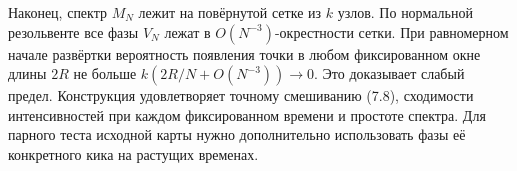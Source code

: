 \documentclass[11pt,a4paper]{article}
\begin{document}
Наконец, спектр $M_N$ лежит на повёрнутой сетке из $k$ узлов. По нормальной резольвенте все фазы $V_N$ лежат в $O(N^{-3})$-окрестности сетки. При равномерном начале развёртки вероятность появления точки в любом фиксированном окне длины $2R$ не больше $k(2R/N+O(N^{-3}))\to0$. Это доказывает слабый предел. Конструкция удовлетворяет точному смешиванию (7.8), сходимости интенсивностей при каждом фиксированном времени и простоте спектра. Для парного теста исходной карты нужно дополнительно использовать фазы её конкретного кика на растущих временах.
\end{document}

